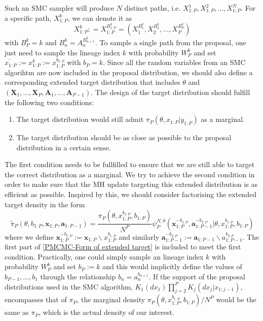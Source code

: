 \documentclass[12pt,a4paper]{article}
\begin{document}
Such an SMC sampler will produce $N$ distinct paths, i.e. $X_{1:P}^1, X_{1:P}^2,...,X_{1:P}^N$. For a specific path, $X_{1:P}^k$, we can denote it as 
$$X_{1:P}^k : = X_{1:P}^{B_{1:P}^k}=\left(X_1^{B_1^k},X_2^{B_2^k},...,X_P^{B_P^k}\right)$$
with $B_P^k = k$ and $B_n^k = A_{n}^{B_{n+1}^k}$. To sample a single path from the proposal, one just need to sample the lineage index $k$ with probability $W_P^k$ and set $x_{1:P}^{'}:= x_{1:P}^{k}:=x_{1:P}^{b_{1:P}}$ with $b_P = k$. Since all the random variables from an SMC algorihtm are now included in the proposal distribution, we should also define a corresponding extended target distribution that includes $\theta$ and $\left(\mathbf{X}_1,...,\mathbf{X}_P,\mathbf{A}_1,...,\mathbf{A}_{P-1}\right)$. The design of the target distribution should fulfill the following two conditions:
\begin{enumerate}[label=\textit{Condition \arabic*.},leftmargin=*]
    \item The target distribution would still admit $\pi_P(\theta,x_{1:P}|y_{1:P})$ as a marginal.
    \item The target distribution should be as close as possible to the proposal distribution in a certain sense.
\end{enumerate}
The first condition needs to be fullfilled to ensure that we are still able to target the correct distribution as a marginal. We try to achieve the second condition in order to make sure that the MH update targeting this extended distribution is as efficient as possible. Inspired by this, we should consider factorising the extended target density in the form
\begin{equation}
    \label{PMCMC-Form of extended target}
    \tilde{\pi}_P(\theta,b_{1:P},\mathbf{x}_{1:P},\mathbf{a}_{1:P-1}) = \frac{\pi_{P}(\theta,x_{1:P}^{b_{1:P}},b_{1:P})}{N^P}\psi_P^{N,\theta}(\mathbf{x}_{1:P}^{-b_{1:P}},\mathbf{a}_{1:P-1}^{-b_{2:P}}|\theta,x_{1:P}^{b_{1:P}},b_{1:P})
\end{equation}  
where we define $\mathbf{x}_{1:P}^{-b_{1:P}} := \mathbf{x}_{1:P}\backslash x_{1:P}^{b_{1:P}}$ and similarly $\mathbf{a}_{1:P-1}^{-b_{2:P}} := \mathbf{a}_{1:P-1} \backslash a_{1:P-1}^{b_{2:P}}$. The first part of \eqref{PMCMC-Form of extended target} is included to meet the first condition. Practically, one could simply sample an lineage index $k$ with probability $W_P^k$ and set $b_P:=k$ and this would implicitly define the values of $b_{P-1},...,b_1$ through the relationship $b_n = a_n^{b_{n+1}}$. If the support of the proposal distributions used in the SMC algorithm, $K_1(dx_1)\prod_{j=2}^{P}K_j(dx_j|x_{1:j-1})$, encompasses that of $\pi_P$, the marginal density $\pi_P(\theta,x_{1:P}^{b_{1:P}},b_{1:P})/N^P$ would be the same as $\pi_P$, which is the actual density of our interest. 
\end{document}
